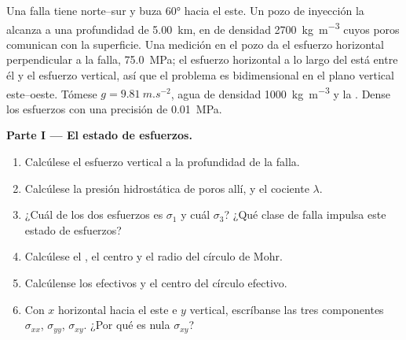 \begin{problem}
\label{pb:b1:stress-strain-rheology:1}
Una falla tiene  norte--sur y buza \ang{60} hacia el este. Un pozo de inyección la alcanza a una profundidad de
\qty{5.00}{km}, en  de densidad \qty{2700}{kg.m^{-3}} cuyos poros comunican con la superficie. Una medición en el
pozo da el esfuerzo horizontal perpendicular a la falla, \qty{75.0}{MPa}; el esfuerzo horizontal a lo largo del  está
entre él y el esfuerzo vertical, así que el problema es bidimensional en el plano vertical este--oeste. Tómese
$g = \qty{9.81}{m.s^{-2}}$, agua de densidad \qty{1000}{kg.m^{-3}} y la . Dense los esfuerzos con una
precisión de \qty{0.01}{MPa}.

\medskip
\noindent\textbf{Parte I --- El estado de esfuerzos.}
\begin{enumerate}
  \item Calcúlese el esfuerzo vertical a la profundidad de la falla.
  \item Calcúlese la presión hidrostática de poros allí, y el cociente $\lambda$.
  \item ¿Cuál de los dos esfuerzos es $\sigma_1$ y cuál $\sigma_3$? ¿Qué clase de falla impulsa este estado de esfuerzos?
  \item Calcúlese el , el centro y el radio del círculo de Mohr.
  \item Calcúlense los  efectivos y el centro del círculo efectivo.
  \item Con $x$ horizontal hacia el este e $y$ vertical, escríbanse las tres componentes $\sigma_{xx}$, $\sigma_{yy}$,
        $\sigma_{xy}$. ¿Por qué es nula $\sigma_{xy}$?
\end{enumerate}


\end{problem}
